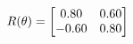 \documentclass[preview]{standalone}
\begin{document}
\begin{align*}
\special{dvisvgm:raw <g id='unique000'>}R(\theta) = \begin{bmatrix}0.80 & 0.60\\-0.60 & 0.80\end{bmatrix}\special{dvisvgm:raw </g>}
\end{align*}
\end{document}
